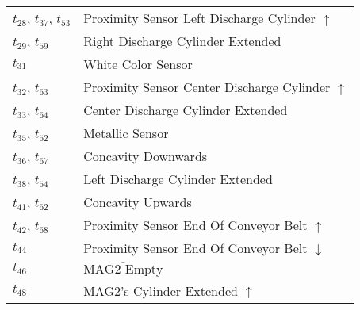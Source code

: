 \begin{longtable}{M{5cm}M{10cm}}
\hyperlink{completeNet:t28}{\hypertarget{completeTable:t28}{$t_{28}$}}, \hyperlink{completeNet:t37}{\hypertarget{completeTable:t37}{$t_{37}$}}, \hyperlink{completeNet:t53}{\hypertarget{completeTable:t53}{$t_{53}$}} & Proximity Sensor Left Discharge Cylinder \(\uparrow\)\\
\hyperlink{completeNet:t29}{\hypertarget{completeTable:t29}{$t_{29}$}}, \hyperlink{completeNet:t59}{\hypertarget{completeTable:t59}{$t_{59}$}} & Right Discharge Cylinder Extended\\
\hyperlink{completeNet:t31}{\hypertarget{completeTable:t31}{$t_{31}$}} & White Color Sensor\\
\hyperlink{completeNet:t32}{\hypertarget{completeTable:t32}{$t_{32}$}}, \hyperlink{completeNet:t63}{\hypertarget{completeTable:t63}{$t_{63}$}} & Proximity Sensor Center Discharge Cylinder \(\uparrow\)\\
\hyperlink{completeNet:t33}{\hypertarget{completeTable:t33}{$t_{33}$}}, \hyperlink{completeNet:t64}{\hypertarget{completeTable:t64}{$t_{64}$}} & Center Discharge Cylinder Extended\\
\hyperlink{completeNet:t35}{\hypertarget{completeTable:t35}{$t_{35}$}}, \hyperlink{completeNet:t52}{\hypertarget{completeTable:t52}{$t_{52}$}} & Metallic Sensor\\
\hyperlink{completeNet:t36}{\hypertarget{completeTable:t36}{$t_{36}$}}, \hyperlink{completeNet:t67}{\hypertarget{completeTable:t67}{$t_{67}$}} & Concavity Downwards\\
\hyperlink{completeNet:t38}{\hypertarget{completeTable:t38}{$t_{38}$}}, \hyperlink{completeNet:t54}{\hypertarget{completeTable:t54}{$t_{54}$}} & Left Discharge Cylinder Extended\\
\hyperlink{completeNet:t41}{\hypertarget{completeTable:t41}{$t_{41}$}}, \hyperlink{completeNet:t62}{\hypertarget{completeTable:t62}{$t_{62}$}} & Concavity Upwards\\
\hyperlink{completeNet:t42}{\hypertarget{completeTable:t42}{$t_{42}$}}, \hyperlink{completeNet:t68}{\hypertarget{completeTable:t68}{$t_{68}$}} & Proximity Sensor End Of Conveyor Belt \(\uparrow\)\\
\hyperlink{completeNet:t44}{\hypertarget{completeTable:t44}{$t_{44}$}} & Proximity Sensor End Of Conveyor Belt \(\downarrow\)\\
\hyperlink{completeNet:t46}{\hypertarget{completeTable:t46}{$t_{46}$}} & \(\overline{\mbox{MAG2 Empty}}\)\\
\hyperlink{completeNet:t48}{\hypertarget{completeTable:t48}{$t_{48}$}} & MAG2's Cylinder Extended \(\uparrow\)\\

\end{longtable}
